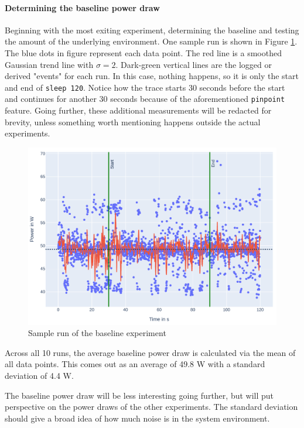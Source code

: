 \paragraph{Determining the baseline power draw}

Beginning with the most exiting experiment, determining the baseline and testing the amount of the underlying environment. 
One sample run is shown in Figure \ref{fig:plot_baseline}.
The blue dots in figure represent each data point. The red line is a smoothed Gaussian trend line with $\sigma = 2$. 
Dark-green vertical lines are the logged or derived "events" for each run. In this case, nothing happens, so it is only the start and end of \verb|sleep 120|. 
Notice how the trace starts 30 seconds before the start and continues for another 30 seconds because of the aforementioned \verb|pinpoint| feature.
Going further, these additional measurements will be redacted for brevity, unless something worth mentioning happens outside the actual experiments.

\begin{figure}
    \includegraphics[width=\linewidth]{power-measurements/measurements_sleep_0714004033/plot.pdf}
    \caption{Sample run of the baseline experiment}
    \label{fig:plot_baseline}
\end{figure}

Across all 10 runs, the average baseline power draw is calculated via the mean of all data points. This comes out as an average of 49.8 W with a standard deviation of 4.4 W.

The baseline power draw will be less interesting going further, but will put perspective on the power draws of the other experiments. The standard deviation should give a broad idea of how much noise is in the system environment.


